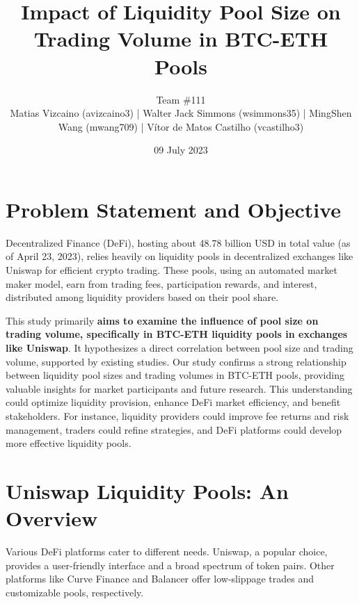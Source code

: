 \documentclass{article}
\makeatletter
\renewcommand{\maketitle}{\bgroup\setlength{\parindent}{0pt}
\begin{center} %
  \Large\@title
  \newline
  \footnotesize\@author
\end{center}
\begin{flushright}
  \@date
\end{flushright}
\egroup}
\makeatother
\begin{document}
\title{Impact of Liquidity Pool Size on Trading Volume in BTC-ETH Pools}
\author{
  Team \#111 \\
   \scriptsize Matias Vizcaino (avizcaino3) | Walter Jack Simmons (wsimmons35) | MingShen Wang (mwang709) | Vítor de Matos Castilho (vcastilho3)
}
\date{09 July 2023}
\maketitle

\noindent


\section*{\textbf{Problem Statement and Objective}}

Decentralized Finance (DeFi), hosting about 48.78 billion USD in total value (as of April 23, 2023\cite{defillama}), relies heavily on liquidity pools in decentralized exchanges like Uniswap for efficient crypto trading. These pools, using an automated market maker model, earn from trading fees, participation rewards, and interest, distributed among liquidity providers based on their pool share\cite{Miori2022,Aigner2021,Xu2023}.

This study primarily \textbf{aims to examine the influence of pool size on trading volume, specifically in BTC-ETH liquidity pools in exchanges like Uniswap}. It hypothesizes a direct correlation between pool size and trading volume, supported by existing studies\cite{Miori2022,Heimbach2022}. Our study confirms a strong relationship between liquidity pool sizes and trading volumes in BTC-ETH pools, providing valuable insights for market participants and future research. This understanding could optimize liquidity provision, enhance DeFi market efficiency, and benefit stakeholders. For instance, liquidity providers could improve fee returns and risk management, traders could refine strategies, and DeFi platforms could develop more effective liquidity pools\cite{Makarov2022,Miori2023}.

\section{\textbf{Uniswap Liquidity Pools: An Overview}}

Various DeFi platforms cater to different needs. Uniswap, a popular choice, provides a user-friendly interface and a broad spectrum of token pairs. Other platforms like Curve Finance and Balancer offer low-slippage trades and customizable pools, respectively\cite{Xu2023}.
\end{document}
